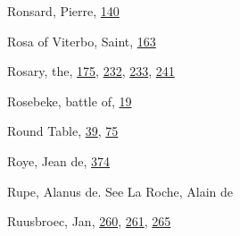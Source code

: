 Ronsard, Pierre,
\protect\hyperlink{11_Chapter_Four__THE_FORMS_OF_LOVE.xhtmlux5cux23page_140}{140}

Rosa of Viterbo, Saint,
\protect\hyperlink{12_Chapter_Five__THE_VISION_OF_DEAT.xhtmlux5cux23page_163}{163}

Rosary, the,
\protect\hyperlink{13_Chapter_Six__THE_DEPICTION_OF_TH.xhtmlux5cux23page_175}{175},
\protect\hyperlink{15_Chapter_Eight__RELIGIOUS_EXCITAT.xhtmlux5cux23page_232}{232},
\protect\hyperlink{15_Chapter_Eight__RELIGIOUS_EXCITAT.xhtmlux5cux23page_233}{233},
\protect\hyperlink{16_Chapter_Nine__THE_DECLINE_OF_SYM.xhtmlux5cux23page_241}{241}

Rosebeke, battle of,
\protect\hyperlink{08_Chapter_One__THE_PASSIONATE_INTE.xhtmlux5cux23page_19}{19}

Round Table,
\protect\hyperlink{09_Chapter_Two__THE_CRAVING_FOR_A_M.xhtmlux5cux23page_39}{39},
\protect\hyperlink{10_Chapter_Three__THE_HEROIC_DREAM.xhtmlux5cux23page_75}{75}

Roye, Jean de,
\protect\hyperlink{21_Chapter_Thirteen__IMAGE_AND_WORD.xhtmlux5cux23page_374}{374}

Rupe, Alanus de. See La Roche, Alain de

Ruusbroec, Jan,
\protect\hyperlink{17_Chapter_Ten__THE_FAILURE_OF_IMAG.xhtmlux5cux23page_260}{260},
\protect\hyperlink{17_Chapter_Ten__THE_FAILURE_OF_IMAG.xhtmlux5cux23page_261}{261},
\protect\hyperlink{17_Chapter_Ten__THE_FAILURE_OF_IMAG.xhtmlux5cux23page_265}{265}

